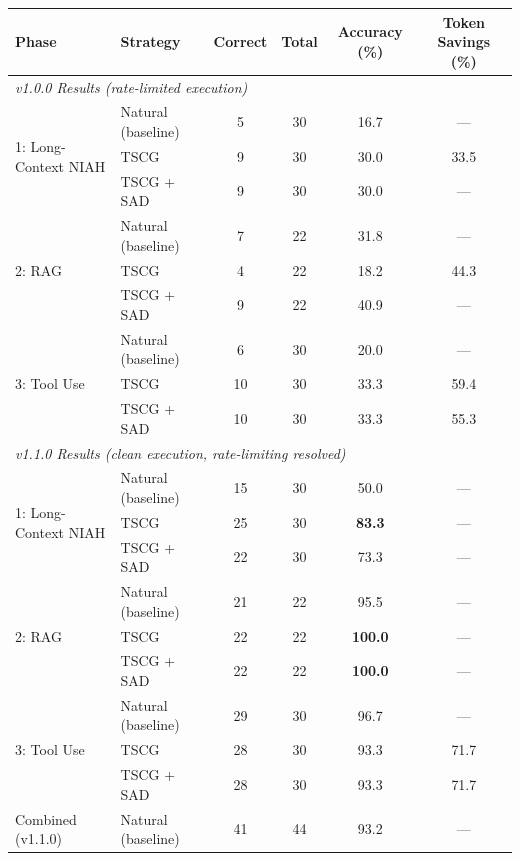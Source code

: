 \begin{table}[t]
\centering
\small
\begin{tabular}{@{}l l ccc c@{}}
\toprule
\textbf{Phase} & \textbf{Strategy} & \textbf{Correct} & \textbf{Total} & \textbf{Accuracy (\%)} & \textbf{Token Savings (\%)} \\
\midrule
\multicolumn{6}{l}{\emph{v1.0.0 Results (rate-limited execution)}} \\
\midrule
\multirow{3}{*}{1: Long-Context NIAH}
    & Natural (baseline)  & 5  & 30 & 16.7 & --- \\
    & TSCG                & 9  & 30 & 30.0 & 33.5 \\
    & TSCG + SAD          & 9  & 30 & 30.0 & --- \\
\midrule
\multirow{3}{*}{2: RAG}
    & Natural (baseline)  & 7  & 22 & 31.8 & --- \\
    & TSCG                & 4  & 22 & 18.2 & 44.3 \\
    & TSCG + SAD          & 9  & 22 & 40.9 & --- \\
\midrule
\multirow{3}{*}{3: Tool Use}
    & Natural (baseline)  & 6  & 30 & 20.0 & --- \\
    & TSCG                & 10 & 30 & 33.3 & 59.4 \\
    & TSCG + SAD          & 10 & 30 & 33.3 & 55.3 \\
\midrule
\multicolumn{6}{l}{\emph{v1.1.0 Results (clean execution, rate-limiting resolved)}} \\
\midrule
\multirow{3}{*}{1: Long-Context NIAH}
    & Natural (baseline)  & 15 & 30 & 50.0 & --- \\
    & TSCG                & 25 & 30 & \textbf{83.3} & --- \\
    & TSCG + SAD          & 22 & 30 & 73.3 & --- \\
\midrule
\multirow{3}{*}{2: RAG}
    & Natural (baseline)  & 21 & 22 & 95.5 & --- \\
    & TSCG                & 22 & 22 & \textbf{100.0} & --- \\
    & TSCG + SAD          & 22 & 22 & \textbf{100.0} & --- \\
\midrule
\multirow{3}{*}{3: Tool Use}
    & Natural (baseline)  & 29 & 30 & 96.7 & --- \\
    & TSCG                & 28 & 30 & 93.3 & 71.7 \\
    & TSCG + SAD          & 28 & 30 & 93.3 & 71.7 \\
\midrule
\multirow{3}{*}{Combined (v1.1.0)}
    & Natural (baseline)  & 41 & 44 & 93.2 & --- \\

\end{tabular}
\end{table}

